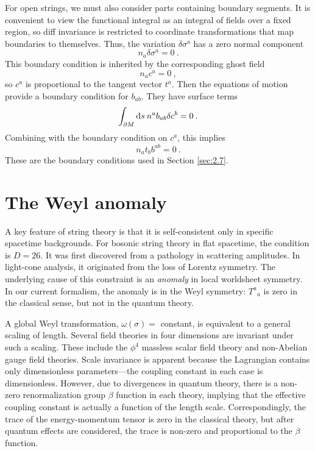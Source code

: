 For open strings, we must also consider parts containing boundary segments. It is convenient to view the functional integral as an integral of fields over a fixed region, so diff invariance is restricted to coordinate transformations that map boundaries to themselves. Thus, the variation $\delta \sigma^{a}$ has a zero normal component    
\begin{equation}
	n_{a} \delta \sigma^{a}=0 \:. \label{3.3.25}
\end{equation}
This boundary condition is inherited by the corresponding ghost field    
\begin{equation}
	n_{a} c^{a}=0 \:, \label{3.3.26}
\end{equation}
so $c^{a}$ is proportional to the tangent vector $t^{a}$. Then the equations of motion provide a boundary condition for $b_{a b}$. They have surface terms    
\begin{equation}
	\int_{\partial M} \mathrm{d} s\: n^{a} b_{a b} \delta c^{b}=0 \:. \label{3.3.27}
\end{equation}
Combining with the boundary condition on $c^a$,    
this implies    
\begin{equation}
	n_{a} t_{b} b^{a b}=0 \:. \label{3.3.28}
\end{equation}
These are the boundary conditions used in Section \ref{sec:2.7}.    

\section{\texorpdfstring{The Weyl anomaly}{3.4 The Weyl anomaly}} \label{sec:3.4}

A key feature of string theory is that it is self-consistent only in specific spacetime backgrounds. For bosonic string theory in flat spacetime, the condition is $D=26$. It was first discovered from a pathology in scattering amplitudes. In light-cone analysis, it originated from the loss of Lorentz symmetry. The underlying cause of this constraint is an \emph{anomaly} in local worldsheet symmetry.    
In our current formalism, the anomaly is in the Weyl symmetry: $T^{a}{}_{a}$ is zero in the classical sense, but not in the quantum theory.    

A global Weyl transformation, $\omega(\sigma)=$ constant, is equivalent to a general scaling of length. Several field theories in four dimensions are invariant under such a scaling. These include the $\phi^4$ massless scalar field theory and non-Abelian gauge field theories. Scale invariance is apparent because the Lagrangian contains only dimensionless parameters—the coupling constant in each case is dimensionless. However, due to divergences in quantum theory, there is a non-zero renormalization group $\beta$ function in each theory, implying that the effective coupling constant is actually a function of the length scale.    
Correspondingly, the trace of the energy-momentum tensor is zero in the classical theory, but after quantum effects are considered, the trace is non-zero and proportional to the $\beta$ function.    

